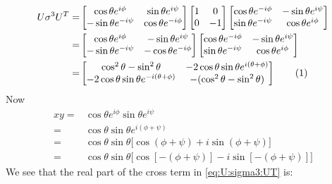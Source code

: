 \documentclass[]{article}
\newcommand\numberthis{\addtocounter{equation}{1}\tag{\theequation}}
\begin{document}
\begin{align*}
	U \sigma^3 U^T =&  \begin{bmatrix}
		\cos{\theta} e^{i\phi}&\sin{\theta}e^{i\psi}\\
		-\sin{\theta}e^{-i\psi}&\cos{\theta} e^{-i\phi}
	\end{bmatrix} \begin{bmatrix}
		1&0\\
		0&-1
	\end{bmatrix} \begin{bmatrix}
		\cos{\theta} e^{-i\phi}&-\sin{\theta}e^{i\psi}\\
		\sin{\theta}e^{-i\psi}&\cos{\theta} e^{i\phi}
	\end{bmatrix}\\
	=& \begin{bmatrix}
		\cos{\theta} e^{i\phi}&-\sin{\theta}e^{i\psi}\\
		-\sin{\theta}e^{-i\psi}&-\cos{\theta} e^{-i\phi}
	\end{bmatrix}  \begin{bmatrix}
		\cos{\theta} e^{-i\phi}&-\sin{\theta}e^{i\psi}\\
		\sin{\theta}e^{-i\psi}&\cos{\theta} e^{i\phi}
	\end{bmatrix}\\
	=& \begin{bmatrix}
		\cos^2{\theta}-\sin^2{\theta}&-2 \cos{\theta}\sin{\theta}e^{i(\theta+\phi)}\\
		-2 \cos{\theta}\sin{\theta}e^{-i(\theta+\phi)}&-(\cos^2{\theta}-\sin^2{\theta})
	\end{bmatrix} \numberthis \label{eq:U:sigma3:UT}
\end{align*}
Now
\begin{align*}
	xy =& \cos{\theta} e^{i\phi} \sin{\theta} e^{i\psi}\\
	=& \cos{\theta} \sin{\theta}  e^{i(\phi + \psi)}\\
	=& \cos{\theta} \sin{\theta}  \big[\cos{(\phi + \psi)}+ i \sin{(\phi + \psi)}\big]\\
	=& \cos{\theta} \sin{\theta}  \big[\cos{[-(\phi + \psi)]}- i \sin{[-(\phi + \psi)]}\big]
\end{align*}
We see that the real part of the cross term in \eqref{eq:U:sigma3:UT} is:
\end{document}
